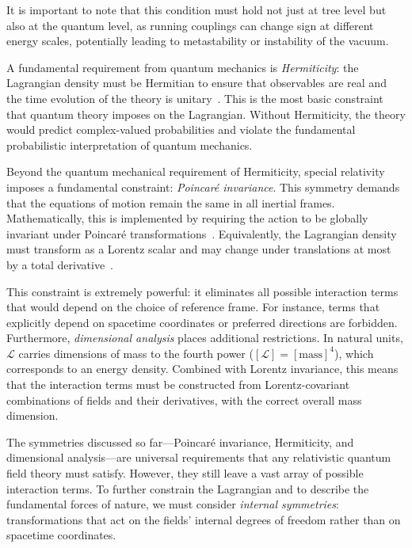 It is important to note that this condition must hold not just at tree level but also at the quantum level, as running couplings can change sign at different energy scales, potentially leading to metastability or instability of the vacuum.

A fundamental requirement from quantum mechanics is \textit{Hermiticity}: the Lagrangian density must be Hermitian to ensure that observables are real and the time evolution of the theory is unitary~\parencite{pall,peskin}. This is the most basic constraint that quantum theory imposes on the Lagrangian. Without Hermiticity, the theory would predict complex-valued probabilities and violate the fundamental probabilistic interpretation of quantum mechanics.

Beyond the quantum mechanical requirement of Hermiticity, special relativity imposes a fundamental constraint: \textit{Poincaré invariance}. This symmetry demands that the equations of motion remain the same in all inertial frames. Mathematically, this is implemented by requiring the action to be globally invariant under Poincaré transformations~\parencite{pall}. Equivalently, the Lagrangian density must transform as a Lorentz scalar and may change under translations at most by a total derivative~\parencite{jose1998classical}.

This constraint is extremely powerful: it eliminates all possible interaction terms that would depend on the choice of reference frame. For instance, terms that explicitly depend on spacetime coordinates or preferred directions are forbidden. Furthermore, \textit{dimensional analysis} places additional restrictions. In natural units, $\mathcal{L}$ carries dimensions of mass to the fourth power ($[\mathcal{L}] = [\text{mass}]^4$), which corresponds to an energy density. Combined with Lorentz invariance, this means that the interaction terms must be constructed from Lorentz-covariant combinations of fields and their derivatives, with the correct overall mass dimension.

The symmetries discussed so far—Poincaré invariance, Hermiticity, and dimensional analysis—are universal requirements that any relativistic quantum field theory must satisfy. However, they still leave a vast array of possible interaction terms. To further constrain the Lagrangian and to describe the fundamental forces of nature, we must consider \textit{internal symmetries}: transformations that act on the fields' internal degrees of freedom rather than on spacetime coordinates.

